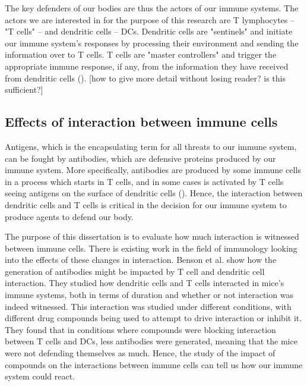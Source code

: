 
The key defenders of our bodies are thus the actors of our immune systems. The actors we are interested in for the purpose of this research are T lymphocytes – "T cells" – and dendritic cells – DCs. Dendritic cells are "sentinels" and initiate our immune system's responses by processing their environment and sending the information over to T cells. T cells are "master controllers" and trigger the appropriate immune response, if any, from the information they have received from dendritic cells (\cite{https://www.immunology.org/public-information/bitesized-immunology/cells/dendritic-cells, https://www.youtube.com/watch?v=hRvyCYyab68}). [how to give more detail without losing reader? is this sufficient?]



\subsection{Effects of interaction between immune cells} \label{bg:interaction}

Antigens, which is the encapsulating term for all threats to our immune system, can be fought by antibodies, which are defensive proteins produced by our immune system. More specifically, antibodies are produced by some immune cells in a process which starts in T cells, and in some cases is activated by T cells seeing antigens on the surface of dendritic cells (\cite{https://elifesciences.org/articles/06994}). Hence, the interaction between dendritic cells and T cells is critical in the decision for our immune system to produce agents to defend our body.

The purpose of this dissertation is to evaluate how much interaction is witnessed between immune cells. There is existing work in the field of immunology looking into the effects of these changes in interaction. Benson et al. show how the generation of antibodies might be impacted by T cell and dendritic cell interaction. They studied how dendritic cells and T cells interacted in mice's immune systems, both in terms of duration and whether or not interaction was indeed witnessed. This interaction was studied under different conditions, with different drug compounds being used to attempt to drive interaction or inhibit it. They found that in conditions where compounds were blocking interaction between T cells and DCs, less antibodies were generated, meaning that the mice were not defending themselves as much. Hence, the study of the impact of compounds on the interactions between immune cells can tell us how our immune system could react. 

